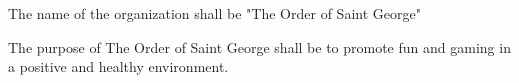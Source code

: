 {
	\begin{article}{}
		\item The name of the organization shall be "The Order of Saint George"
		\item The purpose of The Order of Saint George shall be to promote fun and gaming in a positive and healthy environment.
	\end{article}
}